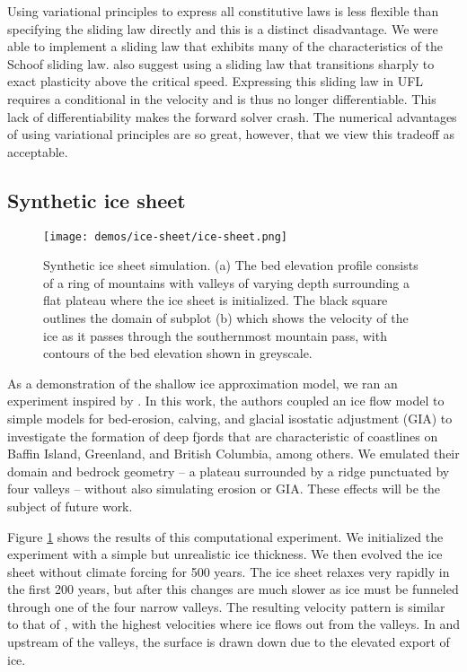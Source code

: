 \documentclass[journal abbreviation, manuscript]{copernicus}
\begin{document}
Using variational principles to express all constitutive laws is less flexible than specifying the sliding law directly and this is a distinct disadvantage.
We were able to implement a sliding law that exhibits many of the characteristics of the Schoof sliding law.
\citet{asay2016experimental} also suggest using a sliding law that transitions sharply to exact plasticity above the critical speed.
Expressing this sliding law in UFL requires a conditional in the velocity and is thus no longer differentiable.
This lack of differentiability makes the forward solver crash.
The numerical advantages of using variational principles are so great, however, that we view this tradeoff as acceptable.


\subsection{Synthetic ice sheet}

\begin{figure}[h]
    \texttt{[image: demos/ice-sheet/ice-sheet.png]}
    \caption{Synthetic ice sheet simulation. (a) The bed elevation profile consists of a ring of mountains with valleys of varying depth surrounding a flat plateau where the ice sheet is initialized.
    The black square outlines the domain of subplot (b) which shows the velocity of the ice as it passes through the southernmost mountain pass, with contours of the bed elevation shown in greyscale.}
    \label{fig:ice-sheet}
\end{figure}

As a demonstration of the shallow ice approximation model, we ran an experiment inspired by \cite{kessler2008fjord}.
In this work, the authors coupled an ice flow model to simple models for bed-erosion, calving, and glacial isostatic adjustment (GIA) to investigate the formation of deep fjords that are characteristic of coastlines on Baffin Island, Greenland, and British Columbia, among others.
We emulated their domain and bedrock geometry -- a plateau surrounded by a ridge punctuated by four valleys -- without also simulating erosion or GIA.
These effects will be the subject of future work.

Figure \ref{fig:ice-sheet} shows the results of this computational experiment.
We initialized the experiment with a simple but unrealistic ice thickness.
We then evolved the ice sheet without climate forcing for 500 years.
The ice sheet relaxes very rapidly in the first 200 years, but after this changes are much slower as ice must be funneled through one of the four narrow valleys.
The resulting velocity pattern is similar to that of \citet{kessler2008fjord}, with the highest velocities where ice flows out from the valleys.
In and upstream of the valleys, the surface is drawn down due to the elevated export of ice.
\end{document}
